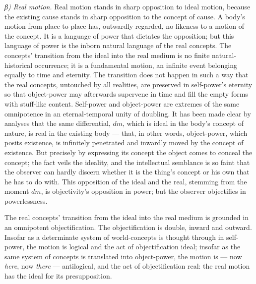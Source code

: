 \documentclass[12pt,a4paper]{book}
\newcommand{\subrunin}[1]{\emph{#1}\hspace{0.4em}}
\begin{document}
\subrunin{β) Real motion.} Real motion stands in sharp opposition to ideal motion, because the
existing cause stands in sharp opposition to the concept of cause. A body's motion from place to
place has, outwardly regarded, no likeness to a motion of the concept. It is a language of power
that dictates the opposition; but this language of power is the inborn natural language of the
real concepts. The concepts' transition from the ideal into the real medium is no finite
natural-historical occurrence; it is a fundamental motion, an infinite event belonging equally to
time and eternity. The transition does not happen in such a way that the real concepts, untouched
by all realities, are preserved in self-power's eternity so that object-power may afterwards
supervene in time and fill the empty forms with
stuff-like content. Self-power and object-power are extremes of the same omnipotence in an
eternal-temporal unity of doubling. It has been made clear by analyses that the same differential,
$dm$, which is ideal in the body's concept of nature, is real in the existing body --- that, in
other words, object-power, which posits existence, is infinitely penetrated and inwardly moved by
the concept of existence. But precisely by expressing its concept the object comes to conceal the
concept; the fact veils the ideality, and the intellectual semblance is so faint that the observer
can hardly discern whether it is the thing's concept or his own that he has to do with. This
opposition of the ideal and the real, stemming from the moment $dm$, is objectivity's opposition
in power; but the observer objectifies in powerlessness.

The real concepts' transition from the ideal into the real medium is grounded in an omnipotent
objectification. The objectification is double, inward and outward. Insofar as a determinate system
of world-concepts is thought through in self-power, the motion is logical and the act of
objectification ideal; insofar as the same system of concepts is translated into object-power, the
motion is --- now \emph{here}, now \emph{there} --- antilogical, and the act of objectification
real: the real motion has the ideal for its presupposition.
\end{document}
